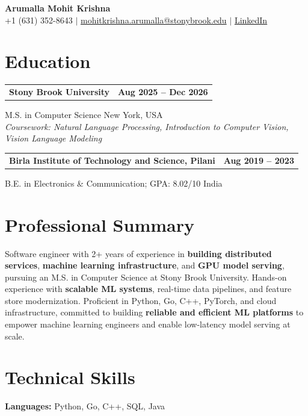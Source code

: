 \documentclass[letterpaper,10pt]{article}
\makeatletter
\newcommand{\entry}[2]{%
  \noindent
  \begin{tabularx}{\linewidth}
    {@{}>{\raggedright\arraybackslash}X@{\hspace{6pt}}r@{}}
    \textbf{#1} & #2
  \end{tabularx}\par
}
\makeatother
\begin{document}
\begin{center}
    {\LARGE\bfseries Arumalla Mohit Krishna}\\[3pt]
    +1 (631) 352-8643 $|$
    \href{mailto:mohitkrishna.arumalla@stonybrook.edu}
    {mohitkrishna.arumalla@stonybrook.edu} $|$
    \href{https://linkedin.com/in/mohit-krishna-arumalla}
    {LinkedIn}
\end{center}
\vspace{-8pt}

\section{Education}

\entry
  {\textbf{Stony Brook University}}
  {\textbf{Aug 2025 -- Dec 2026}}

M.S. in Computer Science \hfill New York, USA\\
\textit{
Coursework: Natural Language Processing,
Introduction to Computer Vision, Vision Language Modeling
}
\vspace{3pt}

\entry
  {\textbf{Birla Institute of Technology and Science, Pilani}}
  {\textbf{Aug 2019 -- 2023}}

B.E. in Electronics \& Communication; GPA: 8.02/10 \hfill India
\section{Professional Summary}

Software engineer with 2+ years of experience in \textbf{building distributed services}, \textbf{machine learning infrastructure}, and \textbf{GPU model serving}, pursuing an M.S. in Computer Science at Stony Brook University. Hands-on experience with \textbf{scalable ML systems}, real-time data pipelines, and feature store modernization. Proficient in Python, Go, C++, PyTorch, and cloud infrastructure, committed to building \textbf{reliable and efficient ML platforms} to empower machine learning engineers and enable low-latency model serving at scale.

\section{Technical Skills}

\textbf{Languages:}
Python, Go, C++, SQL, Java\\
\end{document}
